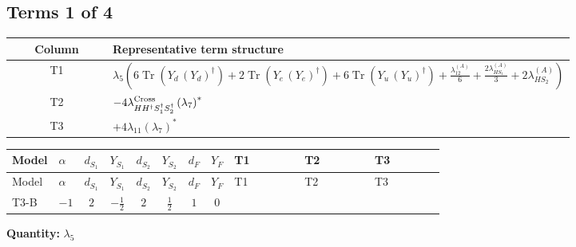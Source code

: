 \documentclass[8pt]{article}
\begin{document}
\begin{landscape}
\subsection*{Terms 1 of 4}
\begin{center}
\begin{tabular}{@{}c >{\raggedright\arraybackslash}p{0.82\linewidth}@{}}
\toprule
Column & Representative term structure \\
\midrule
T1 & \(\displaystyle {\lambda_5} \left(6 \operatorname{Tr}\!\left({Y_d}\,\left({Y_d}\right)^{\dagger}\right)+2 \operatorname{Tr}\!\left({Y_e}\,\left({Y_e}\right)^{\dagger}\right)+6 \operatorname{Tr}\!\left({Y_u}\,\left({Y_u}\right)^{\dagger}\right)+\frac{{\lambda_{12}^{(A)}}}{6}+\frac{2 {\lambda_{HS_1}^{(A)}}}{3}+2 {\lambda_{HS_2}^{(A)}}\right)\) \\
\midrule
T2 & \(\displaystyle -4 {\lambda_{H H^\dagger S_1^\dagger S_2^\dagger}^{\rm Cross}} \left({\lambda_{7}}\right)^{*}\) \\
\midrule
T3 & \(\displaystyle +4 {\lambda_{11}} \left({\lambda_{7}}\right)^{*}\) \\
\midrule
\bottomrule
\end{tabular}
\end{center}
\smallskip
\tiny
\begin{longtable}{@{}llcccccc >{\raggedright\arraybackslash}p{0.21\linewidth} >{\raggedright\arraybackslash}p{0.21\linewidth} >{\raggedright\arraybackslash}p{0.21\linewidth}@{}}
\toprule
Model & $\alpha$ & $d_{S_1}$ & $Y_{S_1}$ & $d_{S_2}$ & $Y_{S_2}$ & $d_F$ & $Y_F$ & T1 & T2 & T3 \\
\midrule
\endfirsthead
\toprule
Model & $\alpha$ & $d_{S_1}$ & $Y_{S_1}$ & $d_{S_2}$ & $Y_{S_2}$ & $d_F$ & $Y_F$ & T1 & T2 & T3 \\
\midrule
\endhead
T3-B & $-1$ & $2$ & $-\frac{1}{2}$ & $2$ & $\frac{1}{2}$ & $1$ & $0$ & \scriptsize\adjustbox{max width=\linewidth}{$\begin{gathered} {\lambda_5} \left(6 \operatorname{Tr}\!\left({Y_d}\,\left({Y_d}\right)^{\dagger}\right)+2 \operatorname{Tr}\!\left({Y_e}\,\left({Y_e}\right)^{\dagger}\right)+6 \operatorname{Tr}\!\left({Y_u}\,\left({Y_u}\right)^{\dagger}\right)+\frac{{\lambda_{12}^{(A)}}}{6}+\frac{2 {\lambda_{HS_1}^{(A)}}}{3}+2 {\lambda_{HS_2}^{(A)}}\right)\end{gathered}$} & \scriptsize\adjustbox{max width=\linewidth}{$\begin{gathered} -4 {\lambda_{H H^\dagger S_1^\dagger S_2^\dagger}^{\rm Cross}} \left({\lambda_{7}}\right)^{*}\end{gathered}$} & \scriptsize\adjustbox{max width=\linewidth}{$\begin{gathered} +4 {\lambda_{11}} \left({\lambda_{7}}\right)^{*}\end{gathered}$} \\
\midrule
\bottomrule
\end{longtable}
\clearpage
\noindent\textbf{Quantity: }$\lambda_5$\par\smallskip

\end{landscape}
\end{document}
